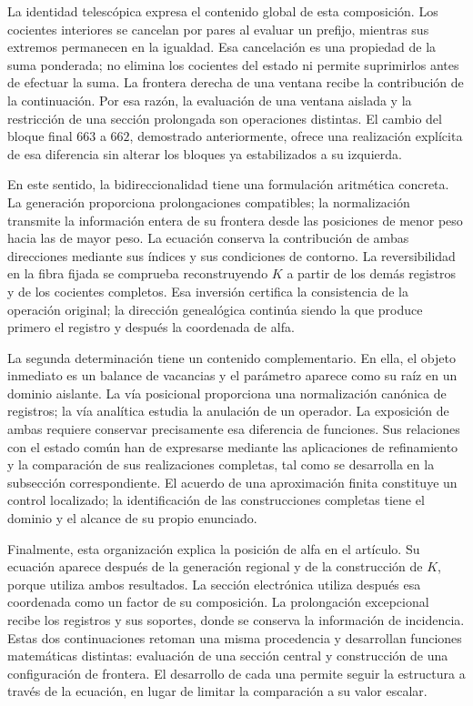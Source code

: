 La identidad telescópica expresa el contenido global de esta composición.
Los cocientes interiores se cancelan por pares al evaluar un prefijo,
mientras sus extremos permanecen en la igualdad. Esa cancelación es una
propiedad de la suma ponderada; no elimina los cocientes del estado ni
permite suprimirlos antes de efectuar la suma. La frontera derecha de una
ventana recibe la contribución de la continuación. Por esa razón, la
evaluación de una ventana aislada y la restricción de una sección
prolongada son operaciones distintas. El cambio del bloque final $663$ a
$662$, demostrado anteriormente, ofrece una realización explícita de esa
diferencia sin alterar los bloques ya estabilizados a su izquierda.

En este sentido, la bidireccionalidad tiene una formulación aritmética
concreta. La generación proporciona prolongaciones compatibles; la
normalización transmite la información entera de su frontera desde las
posiciones de menor peso hacia las de mayor peso. La ecuación conserva la
contribución de ambas direcciones mediante sus índices y sus condiciones
de contorno. La reversibilidad en la fibra fijada se comprueba reconstruyendo
$K$ a partir de los demás registros y de los cocientes completos. Esa
inversión certifica la consistencia de la operación original; la dirección
genealógica continúa siendo la que produce primero el registro y después
la coordenada de alfa.

La segunda determinación tiene un contenido complementario. En ella, el
objeto inmediato es un balance de vacancias y el parámetro aparece como
su raíz en un dominio aislante. La vía posicional proporciona una
normalización canónica de registros; la vía analítica estudia la anulación
de un operador. La exposición de ambas requiere conservar precisamente
esa diferencia de funciones. Sus relaciones con el estado común han de
expresarse mediante las aplicaciones de refinamiento y la comparación de
sus realizaciones completas, tal como se desarrolla en la subsección
correspondiente. El acuerdo de una aproximación finita constituye un
control localizado; la identificación de las construcciones completas
tiene el dominio y el alcance de su propio enunciado.

Finalmente, esta organización explica la posición de alfa en el artículo.
Su ecuación aparece después de la generación regional y de la construcción
de $K$, porque utiliza ambos resultados. La sección electrónica utiliza
después esa coordenada como un factor de su composición. La prolongación
excepcional recibe los registros y sus soportes, donde se conserva la
información de incidencia. Estas dos continuaciones retoman una misma
procedencia y desarrollan funciones matemáticas distintas: evaluación de
una sección central y construcción de una configuración de frontera.
El desarrollo de cada una permite seguir la estructura a través de la
ecuación, en lugar de limitar la comparación a su valor escalar.
